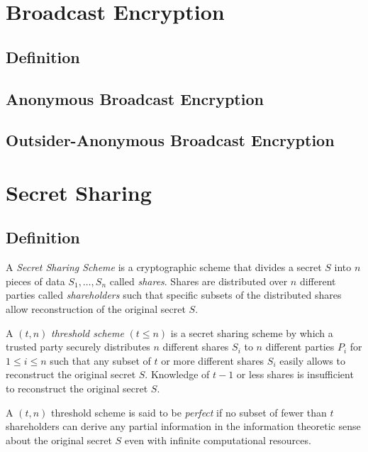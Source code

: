 \section{Broadcast Encryption}

\subsection{Definition}

\subsection{Anonymous Broadcast Encryption}

\subsection{Outsider-Anonymous Broadcast Encryption}


\section{Secret Sharing}

\subsection{Definition}
\begin{defn}
\label{def:secret_sharing_scheme}
 A \textit{Secret Sharing Scheme} is a cryptographic scheme that divides a secret $S$ into $n$ pieces of data $S_1, \ldots, S_n$ called \textit{shares}. Shares are distributed over $n$ different parties called \textit{shareholders} such that specific subsets of the distributed shares allow reconstruction of the original secret $S$.
\end{defn}

\begin{defn}
\label{def:threshold_scheme}
 A $\left( t, n \right)$ \textit{threshold scheme} $\left( t \leq n \right)$ is a secret sharing scheme by which a trusted party securely distributes $n$ different shares $S_i$ to $n$ different parties $P_i$ for $1 \leq i \leq n$ such that any subset of $t$ or more different shares $S_i$ easily allows to reconstruct the original secret $S$. Knowledge of $t-1$ or less shares is insufficient to reconstruct the original secret $S$.
\end{defn}

\begin{defn}
\label{def:threshold_scheme}
 A $\left( t, n \right)$ threshold scheme is said to be \textit{perfect} if no subset of fewer than $t$ shareholders can derive any partial information in the information theoretic sense about the original secret $S$ even with infinite computational resources.
\end{defn}

